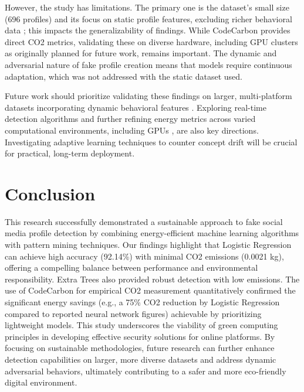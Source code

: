\documentclass[conference]{IEEEtran}
\begin{document}
However, the study has limitations. The primary one is the dataset's small size (696 profiles) and its focus on static profile features, excluding richer behavioral data \cite{b12}; this impacts the generalizability of findings. While CodeCarbon provides direct CO2 metrics, validating these on diverse hardware, including GPU clusters as originally planned for future work, remains important. The dynamic and adversarial nature of fake profile creation means that models require continuous adaptation, which was not addressed with the static dataset used.

Future work should prioritize validating these findings on larger, multi-platform datasets incorporating dynamic behavioral features \cite{b12}. Exploring real-time detection algorithms \cite{b14} and further refining energy metrics across varied computational environments, including GPUs \cite{b13}, are also key directions. Investigating adaptive learning techniques to counter concept drift will be crucial for practical, long-term deployment.

\section{Conclusion}
\label{sec:conclude}
This research successfully demonstrated a sustainable approach to fake social media profile detection by combining energy-efficient machine learning algorithms with pattern mining techniques. Our findings highlight that Logistic Regression can achieve high accuracy (92.14\%) with minimal CO2 emissions (0.0021 kg), offering a compelling balance between performance and environmental responsibility. Extra Trees also provided robust detection with low emissions. The use of CodeCarbon for empirical CO2 measurement quantitatively confirmed the significant energy savings (e.g., a 75\% CO2 reduction by Logistic Regression compared to reported neural network figures) achievable by prioritizing lightweight models. This study underscores the viability of green computing principles in developing effective security solutions for online platforms. By focusing on sustainable methodologies, future research can further enhance detection capabilities on larger, more diverse datasets and address dynamic adversarial behaviors, ultimately contributing to a safer and more eco-friendly digital environment.
\end{document}
